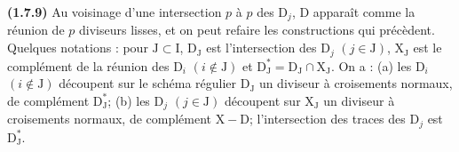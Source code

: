 \documentclass[11pt,leqno]{article}
\begin{document}
\textbf{(1.7.9)} Au voisinage d’une intersection \(p\) à \(p\) des \(\mathrm{D}_j\), \(\mathrm{D}\) apparaît comme la réunion de \(p\) diviseurs lisses, et on peut refaire les constructions qui précèdent. Quelques notations : pour \(\mathrm{J}\subset\mathrm{I}\), \(\mathrm{D}_{\mathrm{J}}\) est l’intersection des \(\mathrm{D}_j\) \((j\in\mathrm{J})\), \(\mathrm{X}_{\mathrm{J}}\) est le complément de la réunion des \(\mathrm{D}_i\) \((i\notin\mathrm{J})\) et \(\mathrm{D}_{\mathrm{J}}^*=\mathrm{D}_{\mathrm{J}}\cap\mathrm{X}_{\mathrm{J}}\). On a : (a) les \(\mathrm{D}_i\) \((i\notin\mathrm{J})\) découpent sur le schéma régulier \(\mathrm{D}_{\mathrm{J}}\) un diviseur à croisements normaux, de complément \(\mathrm{D}_{\mathrm{J}}^*\); (b) les \(\mathrm{D}_j\) \((j\in\mathrm{J})\) découpent sur \(\mathrm{X}_{\mathrm{J}}\) un diviseur à croisements normaux, de complément \(\mathrm{X}-\mathrm{D}\); l’intersection des traces des \(\mathrm{D}_j\) est \(\mathrm{D}_{\mathrm{J}}^*\).
\end{document}
